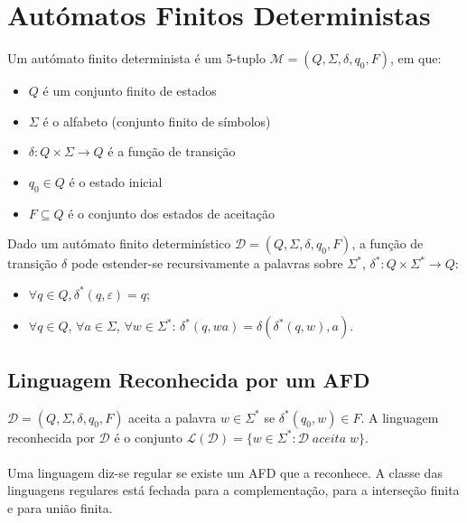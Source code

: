 \documentclass[10pt,a4paper]{report}
\begin{document}
\section{Autómatos Finitos Deterministas}
Um autómato finito determinista é um 5-tuplo $\mathcal{M} = (Q,\Sigma,\delta,q_0,F)$, em que:
\begin{itemize}
\item $Q$ é um conjunto finito de estados
\item $\Sigma$ é o alfabeto (conjunto finito de símbolos)
\item $\delta: Q \times \Sigma \rightarrow Q$ é a função de transição
\item $q_0 \in Q$ é o estado inicial
\item $F \subseteq Q$ é o conjunto dos estados de aceitação
\end{itemize}
Dado um autómato finito determinístico $\mathcal{D} = (Q,\Sigma,\delta,q_0,F)$, a função de transição $\delta$ pode estender-se recursivamente a palavras sobre $\Sigma^*$, $\delta^*: Q \times \Sigma^* \rightarrow Q$:
\begin{itemize}
\item $\forall q \in Q, \delta^*(q, \varepsilon) = q$;
\item $\forall q \in Q$, $\forall a \in \Sigma$, $\forall w \in \Sigma^*$: $\delta^* (q,wa) = \delta(\delta^*(q,w),a)$.
\end{itemize}
\subsection{Linguagem Reconhecida por um AFD}
$\mathcal{D} = (Q,\Sigma,\delta,q_0,F)$ aceita a palavra $w \in \Sigma^*$ se $\delta^*(q_0,w) \in F$. A linguagem reconhecida por $\mathcal{D}$ é o conjunto $\mathcal{L(D)} = \{w \in \Sigma^*: \mathcal{D}\; aceita\; w\}$.\\
\\
Uma linguagem diz-se regular se existe um AFD que a reconhece. A classe das linguagens regulares está fechada para a complementação, para a interseção finita e para união finita.
\end{document}
